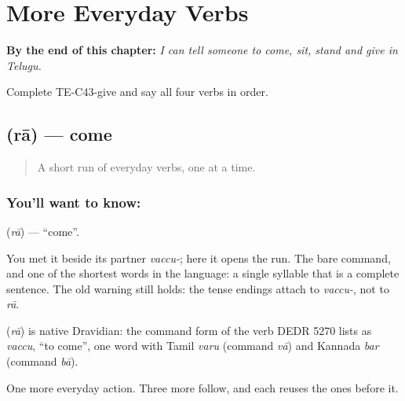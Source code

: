
\chapter{More Everyday Verbs}
\label{ch:te-more-verbs}

\begin{chapteropening}
\textbf{By the end of this chapter:} \emph{I can tell someone to come, sit, stand and give in Telugu.}

Complete TE-C43-give and say all four verbs in order.
\end{chapteropening}

\section[\texorpdfstring{\te{రా} (rā)}{రా (rā)}]{ (rā) — come}

\label{lesson:TE-C43-come}



\begin{quote}
A short run of everyday verbs, one at a time.
\end{quote}

\subsection*{You'll want to know: }
\textbf{} (\emph{rā}) — \textquotedblleft{}come\textquotedblright{}.

You met it beside its partner \emph{vaccu-}; here it opens the run. The bare command, and one of the shortest words in the language: a single syllable that is a complete sentence. The old warning still holds: the tense endings attach to \emph{vaccu-}, not to \emph{rā}.

\begin{cousinweb}
\textbf{} (\emph{rā}) is native Dravidian: the command form of the verb DEDR 5270 lists as \emph{vaccu}, \textquotedblleft{}to come\textquotedblright{}, one word with Tamil \emph{varu} (command \emph{vā}) and Kannada \emph{bar} (command \emph{bā}).
\end{cousinweb}

\begin{grammarlens}[title={What you've built}]
One more everyday action. Three more follow, and each reuses the ones before it.
\end{grammarlens}


